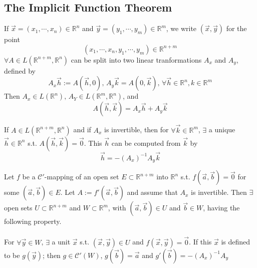 \subsection{The Implicit Function Theorem}
If  $ \vec{x }=(x_1,\cdots,x_n)\in \mathbb{R}^n  $ and  $ \vec{y}=(y_1,\cdots,y_m)\in\mathbb{R}^m $, we write  $ (\vec{x},\vec{y}) $ for the point  \[ (x_1,\cdots,x_n,y_1,\cdots,y_m)\in\mathbb{R}^{n+m} \]
 $ \forall A\in L(\mathbb{R}^{n+m},\mathbb{R}^n) $ can be split into two linear tranformations  $ A_x  $ and  $ A_y  $, defined by 
 \[A_x\vec{h}:=A(\vec{h},0),\,A_y\vec{k}=A(0,\vec{k}),\,\forall \vec{h }\in \mathbb{R}^n,k\in\mathbb{R}^m\]
 Then  $ A_x\in L(\mathbb{R}^n),\,A_Y\in L(\mathbb{R}^m,\mathbb{R}^n) $, and\[A(\vec{h},\vec{k})=A_x\vec{h}+A_y\vec{k}\tag{ $ \ast $ }\]   
 \begin{theorem}
    If  $ A\in L(\mathbb{R}^{n+m},\mathbb{R}^n) $ and if  $ A_x $ is invertible, then for  $ \forall \vec{k}\in \mathbb{R}^m $,  $ \exists  $ a unique  $ \vec{h}\in \mathbb{R}^n  $ s.t.  $ A(\vec{h},\vec{k})=\vec{0} $. This  $ \vec{h} $ can be computed from  $ \vec{k} $    by 
    \[\vec{h}=-(A_x)^{-1}A_y\vec{k}\]
 \end{theorem}
 \begin{theorem}
    Let  $ f  $ be a  $ \mathscr{C}' $-mapping of an open set  $ E\subset \mathbb{R}^{n+m } $ into  $ \mathbb{R}^n $ s.t. $ f(\vec{a},\vec{b})=\vec{0} $ for some  $ (\vec{a},\vec{b})\in E $. Let  $ A:=f'(\vec{a},\vec{b}) $ and assume that  $ A_x  $ is invertible. Then  $ \exists  $ open sets  $ U\subset \mathbb{R}^{n+m} $ and  $ W\subset\mathbb{R}^m  $, with  $ (\vec{a},\vec{b})\in U  $ and  $ \vec{b}\in W $, having the following property.\\
    \\
    For  $ \forall \vec{y}\in W $, $ \exists  $ a unit  $ \vec{x}  $ s.t.  $ (\vec{x},\vec{y})\in U $ and  $ f(\vec{x},\vec{y})=\vec{0} $. If this  $ \vec{x} $ is defined to be  $ g(\vec{y }) $; then  $ g\in \mathscr{C}'(W) $,  $ g(\vec{b})=\vec{a} $ and  $ g'(\vec{b})=-(A_x)^{-1}A_y $             
 \end{theorem}

